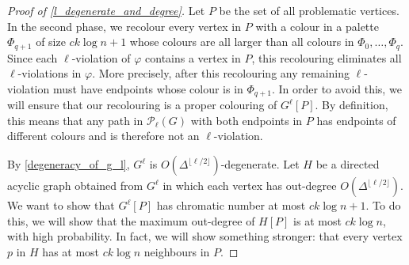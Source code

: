 \documentclass{patmorin}
\begin{document}
\begin{proof}[Proof of \cref{l_degenerate_and_degree}]
  Let $P$ be the set of all problematic vertices.
  In the second phase, we recolour every vertex in $P$ with a colour in a palette $\Phi_{q+1}$ of size $ck\log n + 1$ whose colours are all larger than all colours in $\Phi_0,\ldots,\Phi_q$.  Since each $\ell$-violation of $\varphi$ contains a vertex in $P$, this recolouring eliminates all $\ell$-violations in $\varphi$.  More precisely, after this recolouring any remaining $\ell$-violation must have endpoints whose colour is in $\Phi_{q+1}$.  In order to avoid this, we will ensure that our recolouring is a proper colouring of $G^\ell[P]$.  By definition, this means that any path in $\mathcal{P}_\ell(G)$ with both endpoints in $P$ has endpoints of different colours and is therefore not an $\ell$-violation.

  By \cref{degeneracy_of_g_l}, $G^\ell$ is $O(\Delta^{\lfloor\ell /2\rfloor})$-degenerate.  Let $H$ be a directed acyclic graph obtained from $G^{\ell}$ in which each vertex has out-degree $O(\Delta^{\lfloor\ell /2\rfloor})$.
  We want to show that $G^\ell[P]$ has chromatic number at most $ck\log n+1$.  To do this, we will show that the maximum out-degree of $H[P]$ is at most $ck\log n$, with high probability.  In fact, we will show something stronger: that every vertex $p$ in $H$ has at most $ck\log n$ neighbours in $P$.


\end{proof}
\end{document}
